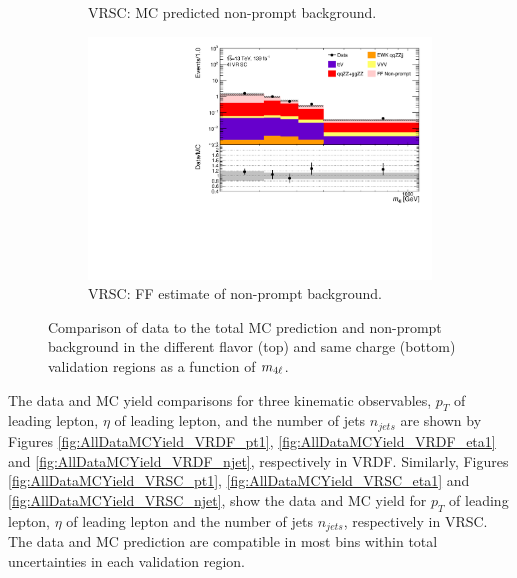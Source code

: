 \begin{figure}[!htb]
\begin{subfigure}{.48\textwidth}
        \caption{VRSC: MC predicted non-prompt background.\label{subfig:VRSCMCRed}}
    \end{subfigure}
    \begin{subfigure}{.48\textwidth}
        \centering
        \includegraphics[width = 0.85\linewidth]{figures/Analysis/Background/Overlay_VRSC_FFApplied_M4l.pdf}
        \caption{VRSC: FF estimate of non-prompt background.\label{subfig:VRSCFF}}
    \end{subfigure}
    \caption{ Comparison of data to the total MC prediction and non-prompt background in the different flavor (top) and same charge (bottom) validation regions as a function of $m_{4\ell}$.\label{fig:VRDataMCYield}}
\end{figure}

The data and MC yield comparisons for three kinematic observables, $p_{T}$ of leading lepton, $\eta$ of leading lepton, and the number of jets $n_{jets}$ are shown by Figures \ref{fig:AllDataMCYield_VRDF_pt1}, \ref{fig:AllDataMCYield_VRDF_eta1} and \ref{fig:AllDataMCYield_VRDF_njet}, respectively in VRDF. Similarly, Figures \ref{fig:AllDataMCYield_VRSC_pt1}, \ref{fig:AllDataMCYield_VRSC_eta1} and \ref{fig:AllDataMCYield_VRSC_njet}, show the data and MC yield for $p_{T}$ of leading lepton, $\eta$ of leading lepton and the number of jets $n_{jets}$, respectively in VRSC. The data and MC prediction are compatible in most bins within total uncertainties in each validation region.

